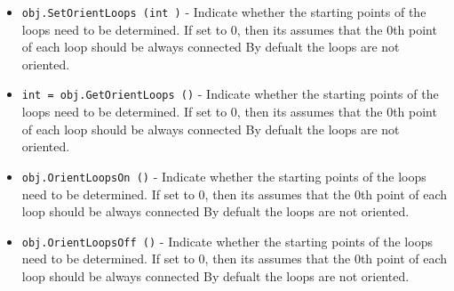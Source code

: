 \begin{itemize}
\item  \verb|obj.SetOrientLoops (int )| -  Indicate whether the starting points of the loops need to be determined.
 If set to 0, then its assumes that the 0th point of each loop should be 
 always connected
 By defualt the loops are not oriented.

\item  \verb|int = obj.GetOrientLoops ()| -  Indicate whether the starting points of the loops need to be determined.
 If set to 0, then its assumes that the 0th point of each loop should be 
 always connected
 By defualt the loops are not oriented.

\item  \verb|obj.OrientLoopsOn ()| -  Indicate whether the starting points of the loops need to be determined.
 If set to 0, then its assumes that the 0th point of each loop should be 
 always connected
 By defualt the loops are not oriented.

\item  \verb|obj.OrientLoopsOff ()| -  Indicate whether the starting points of the loops need to be determined.
 If set to 0, then its assumes that the 0th point of each loop should be 
 always connected
 By defualt the loops are not oriented.

\end{itemize}
